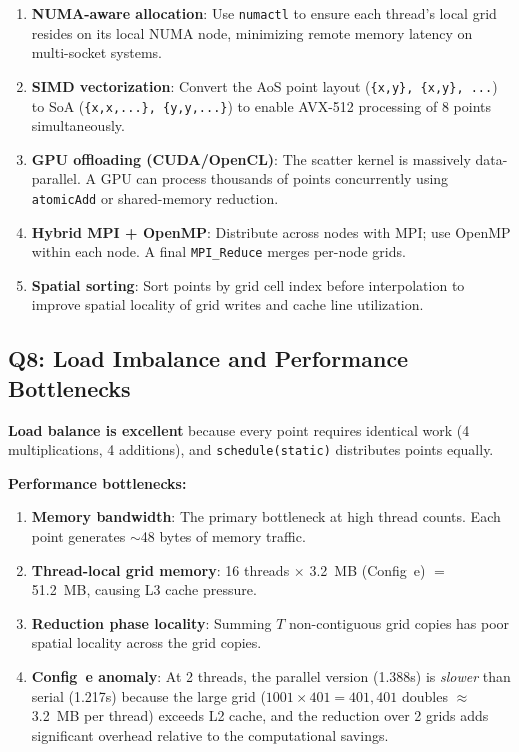 \documentclass[12pt,a4paper]{article}
\begin{document}
\begin{enumerate}
    \item \textbf{NUMA-aware allocation}: Use \texttt{numactl} to ensure each thread's local grid resides on its local NUMA node, minimizing remote memory latency on multi-socket systems.
    
    \item \textbf{SIMD vectorization}: Convert the AoS point layout (\texttt{\{x,y\}, \{x,y\}, ...}) to SoA (\texttt{\{x,x,...\}, \{y,y,...\}}) to enable AVX-512 processing of 8 points simultaneously.
    
    \item \textbf{GPU offloading (CUDA/OpenCL)}: The scatter kernel is massively data-parallel. A GPU can process thousands of points concurrently using \texttt{atomicAdd} or shared-memory reduction.
    
    \item \textbf{Hybrid MPI + OpenMP}: Distribute across nodes with MPI; use OpenMP within each node. A final \texttt{MPI\_Reduce} merges per-node grids.
    
    \item \textbf{Spatial sorting}: Sort points by grid cell index before interpolation to improve spatial locality of grid writes and cache line utilization.
\end{enumerate}

\subsection{Q8: Load Imbalance and Performance Bottlenecks}

\textbf{Load balance is excellent} because every point requires identical work (4 multiplications, 4 additions), and \texttt{schedule(static)} distributes points equally.

\textbf{Performance bottlenecks:}
\begin{enumerate}
    \item \textbf{Memory bandwidth}: The primary bottleneck at high thread counts. Each point generates $\sim$48 bytes of memory traffic.
    \item \textbf{Thread-local grid memory}: 16 threads $\times$ 3.2~MB (Config~e) $=$ 51.2~MB, causing L3 cache pressure.
    \item \textbf{Reduction phase locality}: Summing $T$ non-contiguous grid copies has poor spatial locality across the grid copies.
    \item \textbf{Config~e anomaly}: At 2 threads, the parallel version (1.388s) is \textit{slower} than serial (1.217s) because the large grid ($1001 \times 401 = 401,401$ doubles $\approx$ 3.2~MB per thread) exceeds L2 cache, and the reduction over 2 grids adds significant overhead relative to the computational savings.
\end{enumerate}
\end{document}
